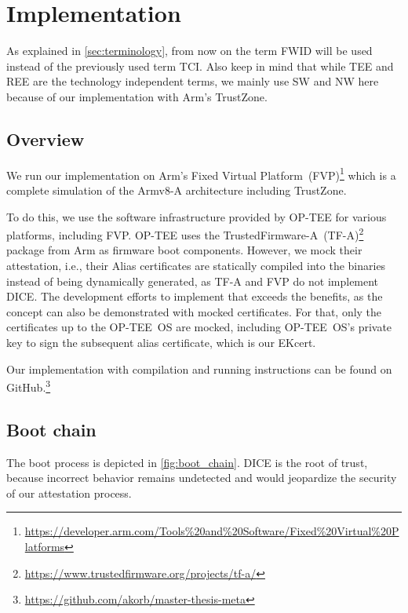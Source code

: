 
\chapter{Implementation}\label{chapter:implementation}

As explained in \autoref{sec:terminology}, from now on the term \acf{FWID} will be used instead of the previously used term \acf{TCI}.
Also keep in mind that while \ac{TEE} and \ac{REE} are the technology independent terms, we mainly use \acf{SW} and \acf{NW} here because of our implementation with Arm's TrustZone.

\section{Overview}


We run our implementation on Arm's Fixed Virtual Platform~(FVP)\footnote{\url{https://developer.arm.com/Tools\%20and\%20Software/Fixed\%20Virtual\%20Platforms}} which is a complete simulation of the Armv8-A architecture including TrustZone.

To do this, we use the software infrastructure provided by OP-TEE for various platforms, including FVP\@.
OP-TEE uses the TrustedFirmware-A~(TF-A)\footnote{\url{https://www.trustedfirmware.org/projects/tf-a/}} package from Arm as firmware boot components.
However, we mock their attestation, i.e., their Alias certificates are statically compiled into the binaries instead of being dynamically generated, as TF-A and FVP do not implement DICE\@.
The development efforts to implement that exceeds the benefits, as the concept can also be demonstrated with mocked certificates.
For that, only the certificates up to the OP-TEE~OS are mocked, including OP-TEE~OS's private key to sign the subsequent alias certificate, which is our EKcert.

Our implementation with compilation and running instructions can be found on GitHub.\footnote{\url{https://github.com/akorb/master-thesis-meta}}

\section{Boot chain}

The boot process is depicted in \autoref{fig:boot_chain}.
DICE is the root of trust, because incorrect behavior remains undetected and would jeopardize the security of our attestation process.

